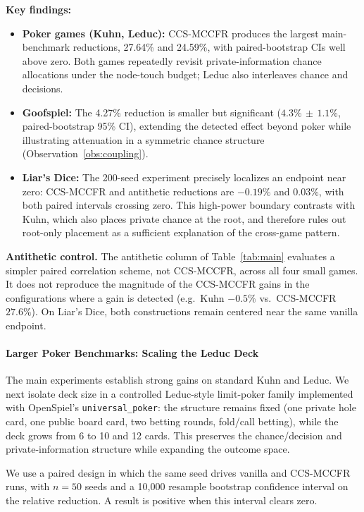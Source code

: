 \documentclass[11pt]{article}
\begin{document}
\textbf{Key findings:}
\begin{itemize}
\item \textbf{Poker games (Kuhn, Leduc):} CCS-MCCFR produces the largest main-benchmark reductions, 27.64\% and 24.59\%, with paired-bootstrap CIs well above zero. Both games repeatedly revisit private-information chance allocations under the node-touch budget; Leduc also interleaves chance and decisions.
\item \textbf{Goofspiel:} The 4.27\% reduction is smaller but significant ($4.3\%\,{\pm}\,1.1\%$, paired-bootstrap 95\% CI), extending the detected effect beyond poker while illustrating attenuation in a symmetric chance structure (Observation~\ref{obs:coupling}).
\item \textbf{Liar's Dice:} The 200-seed experiment precisely localizes an endpoint near zero: CCS-MCCFR and antithetic reductions are $-0.19\%$ and $0.03\%$, with both paired intervals crossing zero. This high-power boundary contrasts with Kuhn, which also places private chance at the root, and therefore rules out root-only placement as a sufficient explanation of the cross-game pattern.
\end{itemize}

\textbf{Antithetic control.} The antithetic column of Table~\ref{tab:main} evaluates a simpler paired correlation scheme, not CCS-MCCFR, across all four small games. It does not reproduce the magnitude of the CCS-MCCFR gains in the configurations where a gain is detected (e.g.\ Kuhn $-0.5\%$ vs.\ CCS-MCCFR $27.6\%$). On Liar's Dice, both constructions remain centered near the same vanilla endpoint.

\paragraph{Larger Poker Benchmarks: Scaling the Leduc Deck}
\label{sec:bigleduc}

The main experiments establish strong gains on standard Kuhn and Leduc. We next isolate deck size in a controlled Leduc-style limit-poker family implemented with OpenSpiel's \texttt{universal\_poker}: the structure remains fixed (one private hole card, one public board card, two betting rounds, fold/call betting), while the deck grows from 6 to 10 and 12 cards. This preserves the chance/decision and private-information structure while expanding the outcome space.

We use a paired design in which the same seed drives vanilla and CCS-MCCFR runs, with $n=50$ seeds and a 10{,}000 resample bootstrap confidence interval on the relative reduction. A result is positive when this interval clears zero.
\end{document}
